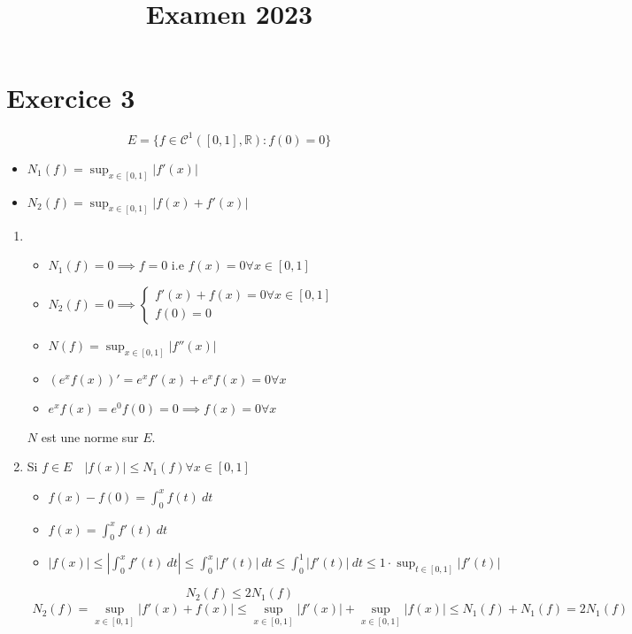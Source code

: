\documentclass[a4paper]{article}
\title{Examen 2023}
\newcommand{\R}{\mathbb{R}}
\begin{document}
\maketitle
\section*{Exercice 3} 
\[
    E = \{ f \in \mathcal{C}^1([0,1], \R): f(0) = 0 \}
\] 
\begin{itemize}
    \item $N_1(f) = \sup_{x \in [0, 1]}|f'(x)|$
    \item $N_2(f) = \sup_{x \in [0, 1]}|f(x) + f'(x)|$
\end{itemize}

\begin{enumerate}
\item 
    \begin{itemize}
        \item 
            $N_1(f) = 0 \implies f = 0$ i.e $f(x) = 0 \forall x \in [0, 1]$
        \item 
            $N_2(f) = 0 \implies \begin{cases}
                f'(x) + f(x) = 0 \forall x \in [0, 1]\\
                f(0) = 0
            \end{cases}$
        \item $N(f) = \sup_{x \in [0,1]} |f''(x)|$
    \end{itemize}
    \begin{itemize}
        \item $(e^xf(x))' = e^xf'(x) + e^xf(x) = 0 \forall x$
        \item $e^xf(x) = e^0f(0) = 0 \implies f(x) = 0 \forall x$
    \end{itemize}
    $N$ est une norme sur $E$.
\item 
    Si $f \in E \quad |f(x)| \le N_1(f) \forall x \in [0,1]$ 
    \begin{itemize}
        \item $f(x) - f(0) = \int_{{0}}^{{x}} {f(t)} \: d{t}$
        \item $f(x) = \int_{{0}}^{{x}} {f'(t)} \: d{t}$
        \item $|f(x)| \le \left| \int_{{0}}^{{x}} {f'(t)} \: d{t} \right| \le \int_{{0}}^{{x}} {|f'(t)|} \: d{t} \le \int_{{0}}^{{1}} {|f'(t)|} \: d{t} \le 1 \cdot \sup_{t \in [0, 1]} |f'(t)|$
    \end{itemize}
    \[
    N_2(f) \le 2N_1(f)
    \] 
    \begin{align*}
        N_2(f) = \sup_{x \in [0, 1]} |f'(x) + f(x)| \le \sup_{x \in [0,1]} |f'(x)| + \sup_{x \in [0, 1]} |f(x)| \le N_1(f) + N_1(f) = 2N_1(f)
    \end{align*}


\end{enumerate}
\end{document}
